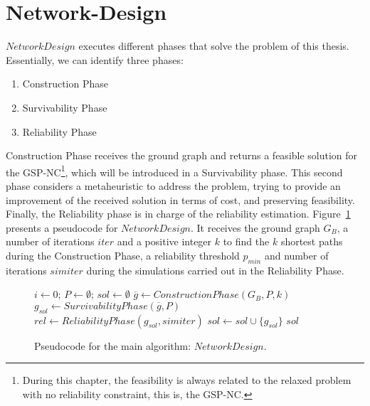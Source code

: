\section{Network-Design}\label{nd}
$NetworkDesign$ executes different phases that solve the problem of this thesis. 
Essentially, we can identify three phases:  
\begin{enumerate}
\item[1.] Construction Phase
\item[2.] Survivability Phase
\item[3.] Reliability Phase
\end{enumerate}

Construction Phase receives the ground graph and returns a feasible solution for the GSP-NC\footnote{During this chapter, the feasibility is always related to the relaxed problem with no reliability constraint, this is, the GSP-NC.}, 
which will be introduced in a Survivability phase. This second phase considers a metaheuristic to address the problem, trying to provide an improvement of the received solution in terms of cost, and preserving feasibility. Finally, the Reliability phase is in charge of the reliability estimation.  
Figure~\ref{MainAlgorithm} presents a pseudocode for $NetworkDesign$. 
It receives the ground graph $G_B$, a number of iterations $iter$ and a positive integer 
$k$ to find the $k$ shortest paths during the Construction Phase, a reliability threshold $p_{min}$ 
and number of iterations $simiter$ during the simulations carried out in the Reliability Phase.


\begin{figure}[H]
\begin{algorithm}[H]
\caption{$sol = NetworkDesign(G_B,iter,k,p_{min},simiter)$}
\begin{algorithmic}[1]
\STATE $i \leftarrow 0; \, P \leftarrow \emptyset; \, sol \leftarrow \emptyset$
\STATE $\overline{g} \leftarrow ConstructionPhase(G_B,P,k)$
\STATE $g_{sol} \leftarrow SurvivabilityPhase(\overline{g},P)$
\STATE $rel \leftarrow ReliabilityPhase(g_{sol},simiter)$
\STATE $sol \leftarrow sol \cup \{g_{sol}\}$
\ENDIF
\ENDWHILE
\RETURN $sol$
\end{algorithmic}
\end{algorithm}
\caption{Pseudocode for the main algorithm: $NetworkDesign$.\label{MainAlgorithm}}
\end{figure}

